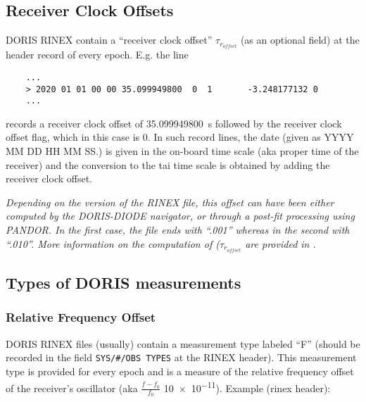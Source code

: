 \subsection{Receiver Clock Offsets}

DORIS RINEX contain a ``receiver clock offset'' \(\tau_{r_{offset}}\) (as an 
optional field) at the header record of every epoch. E.g. the line
\begin{verbatim}
    ...
    > 2020 01 01 00 00 35.099949800  0  1       -3.248177132 0
    ...
\end{verbatim}
records a receiver clock offset of \SI{35.099949800}{\second} followed by the 
receiver clock offset flag, which in this case is \num{0}. In such record 
lines, the date (given as YYYY MM DD HH MM SS.) is given in the on-board time 
scale (aka proper time of the receiver) and the conversion to the \gls{tai} 
time scale is obtained by adding the receiver clock offset.

\textit{Depending on the version of the RINEX file, this offset can have been either 
computed by the DORIS-DIODE navigator, or through a post-fit processing using PANDOR. 
In the first case, the file ends with ``.001'' whereas in the second with ``.010''. 
More information on the computation of (\(\tau_{r_{offset}}\) are provided in 
\cite{lemoine-2016}.}

\subsection{Types of DORIS measurements}
\label{ssec:types-of-doris-measurements}

\subsubsection{Relative Frequency Offset}
\label{sssec:relative-frequency-offset}

DORIS RINEX files (usually) contain a measurement type labeled ``F'' (should be 
recorded in the field \verb|SYS/#/OBS TYPES| at the RINEX header). This measurement 
type is provided for every epoch and is a measure of the relative frequency 
offset of the receiver's oscillator (aka \(\frac{f-f_0}{f_0}\) \num{10e-11}).
Example (rinex header):

